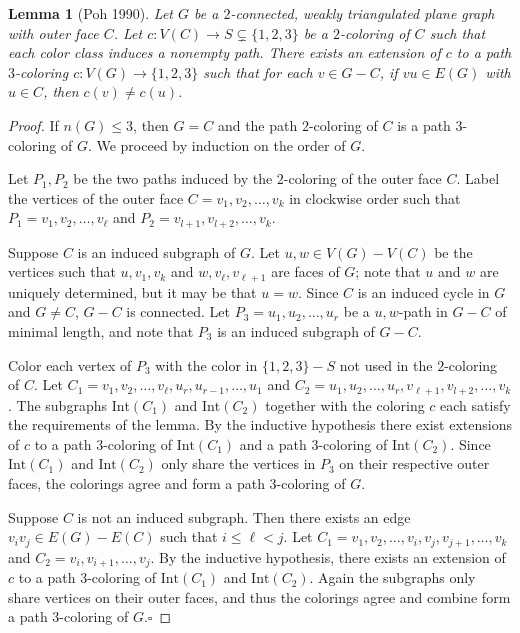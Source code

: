 \documentclass[12pt,letterpaper]{article}
\theoremstyle{plain}
\newtheorem{lemma}{Lemma}[section]           %
\theoremstyle{definition}
\theoremstyle{break}
\newcommand{\ggcqedsymbol}{$\square$}
\newcommand{\ggcqed}{\hbox{}\nobreak\hbox{\quad\ggcqedsymbol}}
\newcommand{\ggcnopf}{\ggcqed}
\begin{document}
\begin{lemma}[Poh 1990]\label{L:planar3c}
Let $G$ be a $2$-connected, weakly triangulated plane graph with outer face
$C$. Let $c:V(C)\to S\subsetneq\{1,2,3\}$ be a $2$-coloring of $C$ such
that each color class induces a nonempty path. There exists an extension of
$c$ to a path $3$-coloring $c:V(G)\to\{1,2,3\}$ such that for each $v\in G-C$, if $vu\in
E(G)$ with $u\in C$, then $c(v)\ne c(u)$.
\end{lemma}

\begin{proof}
If $n(G)\le 3$, then $G=C$ and the path $2$-coloring of $C$ is a path
$3$-coloring of $G$. We proceed by induction on the order of $G$. 

Let $P_1,P_2$ be the two paths induced by the $2$-coloring of the outer face
$C$. 
Label the vertices of the outer face $C=v_1,v_2,\ldots, v_k$ in clockwise
order such that $P_1=v_1,v_2,\ldots, v_\ell$ and
$P_2=v_{l+1},v_{l+2},\ldots, v_k$.

Suppose $C$ is an induced subgraph of $G$. Let
$u,w\in V(G)-V(C)$ be the vertices such that $u,v_1,v_k$ and $w,v_\ell,v_{\ell+1}$
are faces of $G$; note that
$u$ and $w$ are uniquely determined, but it may be that $u=w$. Since
$C$ is an induced cycle in $G$ and $G\ne C$, $G-C$ is connected.
Let $P_3=u_1,u_2,\ldots,u_r$ be a $u,w$-path in $G-C$ of minimal length, and
note that $P_3$ is an induced subgraph of $G-C$.

Color each vertex of $P_3$ with the color in $\{1,2,3\}- S$ not used
in the $2$-coloring of
$C$. Let $C_1=v_1,v_2,\ldots,v_\ell,u_r,u_{r-1},\ldots,u_1$ and
$C_2=u_1,u_2,\ldots,u_r,v_{\ell+1},v_{l+2},\ldots,v_k$. The subgraphs
$\text{Int}(C_1)$ and $\text{Int}(C_2)$ together with the coloring $c$
each satisfy the requirements of the lemma. By the inductive hypothesis
there exist extensions of $c$ to a path
$3$-coloring of $\text{Int}(C_1)$ and a path $3$-coloring of $\text{Int}(C_2)$.
Since $\text{Int}(C_1)$ and $\text{Int}(C_2)$ only share the vertices in $P_3$
on their respective outer faces, the colorings agree and form a path
$3$-coloring of $G$.

Suppose $C$ is not an induced subgraph. Then there
exists an edge $v_iv_j\in E(G)-E(C)$ such that $i\le \ell < j$. Let
$C_1=v_1,v_2,\ldots,v_i,v_j,v_{j+1},\ldots,v_k$
and $C_2=v_i,v_{i+1},\ldots,v_j$.
By the inductive hypothesis, there exists an extension of $c$ to a path
$3$-coloring of $\text{Int}(C_1)$ and $\text{Int}(C_2)$. Again
the subgraphs only share vertices on their outer faces, and thus the
colorings agree and combine form a path $3$-coloring of $G$.\ggcnopf
\end{proof}
\end{document}
